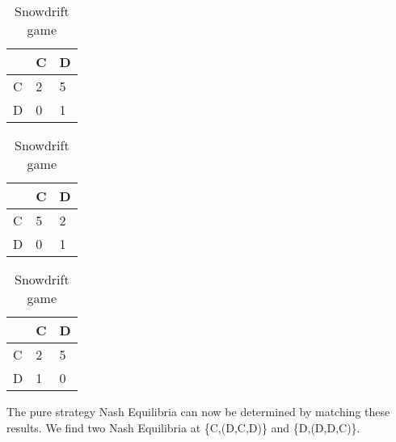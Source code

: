\documentclass[a4paper, 11pt]{article}
\begin{document}
\begin{table}[!htb]
    \begin{minipage}{.33\linewidth}
      \caption{Prisonners dilemma}
      \label{table-PrisonnersDilemmaPayoffB}
      \centering
\begin{tabular}{l|l|l|}
\cline{2-3}
                        & C & D                         \\ \hline
\multicolumn{1}{|l|}{C} & 2 & \cellcolor[HTML]{9AFF99}5 \\ \hline
\multicolumn{1}{|l|}{D} & 0 & \cellcolor[HTML]{9AFF99}1 \\ \hline
\end{tabular}
    \end{minipage}%
    \begin{minipage}{.33\linewidth}
      \centering
      \caption{Stag-Hunt game}
      \label{table-Stag-HuntPayoffB}
\begin{tabular}{l|l|l|}
\cline{2-3}
                        & C                         & D                         \\ \hline
\multicolumn{1}{|l|}{C} & \cellcolor[HTML]{9AFF99}5 & 2                         \\ \hline
\multicolumn{1}{|l|}{D} & 0                         & \cellcolor[HTML]{9AFF99}1 \\ \hline
\end{tabular}
    \end{minipage} 
    \begin{minipage}{.33\linewidth}
      \centering
        \caption{Snowdrift game}
        \label{table-SnowdriftGamePayoffB}
\begin{tabular}{l|l|l|}
\cline{2-3}
                        & C                         & D                         \\ \hline
\multicolumn{1}{|l|}{C} & 2                         & \cellcolor[HTML]{9AFF99}5 \\ \hline
\multicolumn{1}{|l|}{D} & \cellcolor[HTML]{9AFF99}1 & 0                         \\ \hline
\end{tabular}
    \end{minipage} 
\end{table}


The pure strategy Nash Equilibria can now be determined by matching these results. We find two Nash Equilibria at \{C,(D,C,D)\} and \{D,(D,D,C)\}.



\newpage
\end{document}
